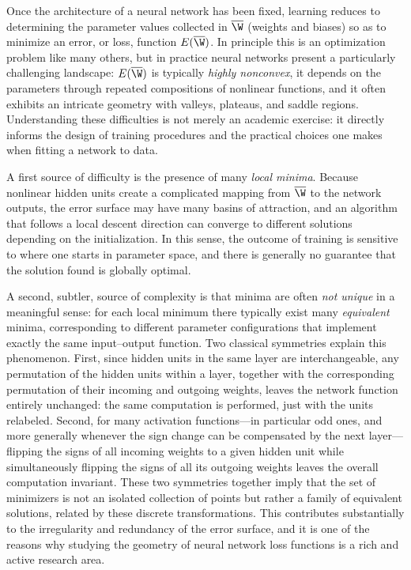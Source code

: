 Once the architecture of a neural network has been fixed, learning reduces to determining the parameter values collected in $\overline{\W}$ (weights and biases) so as to minimize an error, or loss, function $E(\overline{\W})$. In principle this is an optimization problem like many others, but in practice neural networks present a particularly challenging landscape: $E(\overline{\W})$ is typically \emph{highly nonconvex}, it depends on the parameters through repeated compositions of nonlinear functions, and it often exhibits an intricate geometry with valleys, plateaus, and saddle regions. Understanding these difficulties is not merely an academic exercise: it directly informs the design of training procedures and the practical choices one makes when fitting a network to data.

A first source of difficulty is the presence of many \emph{local minima}. Because nonlinear hidden units create a complicated mapping from $\overline{\W}$ to the network outputs, the error surface may have many basins of attraction, and an algorithm that follows a local descent direction can converge to different solutions depending on the initialization. In this sense, the outcome of training is sensitive to where one starts in parameter space, and there is generally no guarantee that the solution found is globally optimal.

A second, subtler, source of complexity is that minima are often \emph{not unique} in a meaningful sense: for each local minimum there typically exist many \emph{equivalent} minima, corresponding to different parameter configurations that implement exactly the same input--output function. Two classical symmetries explain this phenomenon. First, since hidden units in the same layer are interchangeable, any permutation of the hidden units within a layer, together with the corresponding permutation of their incoming and outgoing weights, leaves the network function entirely unchanged: the same computation is performed, just with the units relabeled. Second, for many activation functions---in particular odd ones, and more generally whenever the sign change can be compensated by the next layer---flipping the signs of all incoming weights to a given hidden unit while simultaneously flipping the signs of all its outgoing weights leaves the overall computation invariant. These two symmetries together imply that the set of minimizers is not an isolated collection of points but rather a family of equivalent solutions, related by these discrete transformations. This contributes substantially to the irregularity and redundancy of the error surface, and it is one of the reasons why studying the geometry of neural network loss functions is a rich and active research area.

